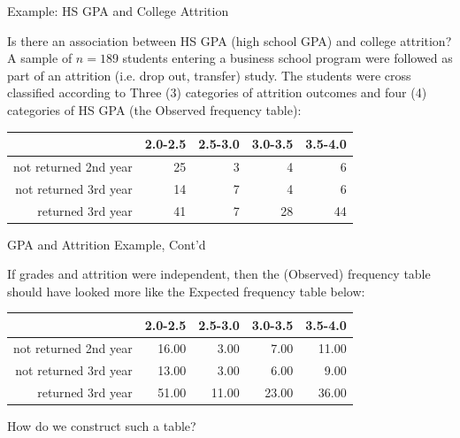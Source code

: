 \documentclass[14pt]{beamer}\usepackage[]{graphicx}\usepackage[]{color}
\begin{document}
\begin{frame}[fragile]{Example: HS GPA and College Attrition}

Is there an association between HS GPA (high school GPA) and college  attrition? A sample of $n = 189$ students entering a business school  program were followed as part of an attrition (i.e. drop out, transfer) study.  The students were cross classified according to Three (3) categories of attrition  outcomes and four (4) categories of HS GPA (the Observed frequency table):

{\small{
\begin{table}[ht]
\centering
\begin{tabular}{rrrrr}
  \hline
 & 2.0-2.5 & 2.5-3.0 & 3.0-3.5 & 3.5-4.0 \\ 
  \hline
not returned 2nd year & 25 & 3 & 4 & 6 \\ 
  not returned 3rd year & 14 & 7 & 4 & 6 \\ 
  returned 3rd year & 41 & 7 & 28 & 44 \\ 
   \hline
\end{tabular}
\end{table}

}}
\end{frame}

\begin{frame}[fragile]{GPA and Attrition Example, Cont'd}

If grades and attrition were independent, then the (Observed) frequency  table should have looked more like the Expected frequency table below:

{\small{
\begin{table}[ht]
\centering
\begin{tabular}{rrrrr}
  \hline
 & 2.0-2.5 & 2.5-3.0 & 3.0-3.5 & 3.5-4.0 \\ 
  \hline
not returned 2nd year & 16.00 & 3.00 & 7.00 & 11.00 \\ 
  not returned 3rd year & 13.00 & 3.00 & 6.00 & 9.00 \\ 
  returned 3rd year & 51.00 & 11.00 & 23.00 & 36.00 \\ 
   \hline
\end{tabular}
\end{table}

}}

How do we construct such a table?

\end{frame}
\end{document}
